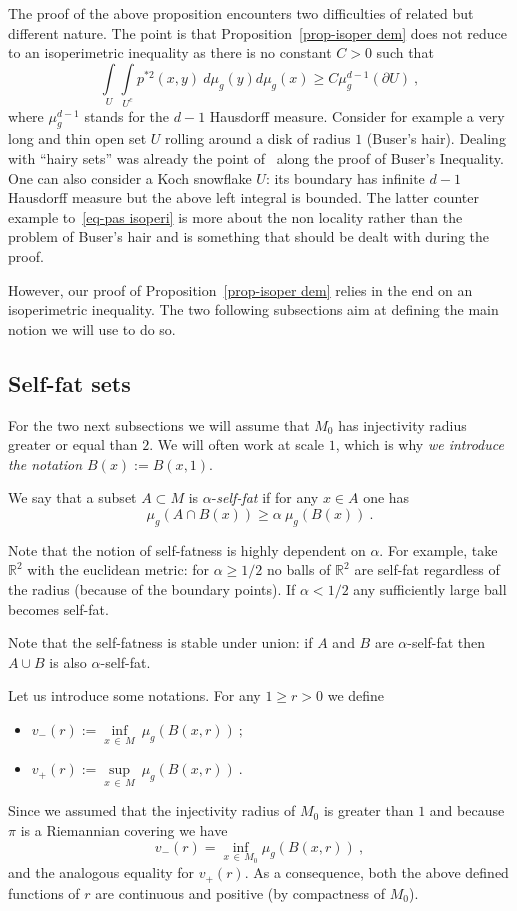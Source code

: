 \documentclass[AHL,Unicode,longabstracts,published]{cedram}
\newcommand{\RR}{\mathbb{R}}
\newcommand{\inte}[1]{\underset{#1}{\int}}
\newcommand{\infi}[1]{\underset{#1}{\inf}}
\newcommand{\supr}[1]{\underset{#1}{\sup}}
\begin{document}
The proof of the above proposition encounters two difficulties of related but different nature. The point is that Proposition~\ref{prop-isoper dem} does not reduce to an isoperimetric inequality as there is no constant $C > 0$ such that
\begin{equation}\label{eq-pas isoperi}
\inte{U} \inte{U^c} p^{*2}(x,y) \ d \mu_g(y) d \mu_g(x) \geq C \mu^{d-1}_g (\partial U) \ ,
\end{equation}
where $\mu^{d-1}_g$ stands for the $d-1$ Hausdorff measure. Consider for example a very long and thin open set $U$ rolling around a disk of radius $1$ (Buser's hair). Dealing with ``hairy sets'' was already the point of~\cite{artbuser} along the proof of Buser's Inequality. One can also consider a Koch snowflake $U$: its boundary has infinite $d-1$ Hausdorff measure but the above left integral is bounded. The latter counter example to~\eqref{eq-pas isoperi} is more about the non locality rather than the problem of Buser's hair and is something that should be dealt with during the proof.


However, our proof of Proposition~\ref{prop-isoper dem} relies in the end on an isoperimetric inequality. The two following subsections aim at defining the main notion we will use to do so.


\subsection{Self-fat sets}
For the two next subsections we will assume that $M_0$ has injectivity radius greater or equal than $2$. We will often work at scale $1$, which is why \emph{we introduce the notation $B(x) := B(x,1)$}.

We say that a subset $A \subset M$ is $\alpha$-\emph{self-fat} if for any $x \in A$ one has
\[
\mu_g(A \cap B(x)) \ge \alpha \ \mu_g(B(x)) \ .
\]

Note that the notion of self-fatness is highly dependent on $\alpha$. For example, take $\RR^2$ with the euclidean metric: for $\alpha \ge 1/2$ no balls of $\RR^2$ are self-fat regardless of the radius (because of the boundary points). If $\alpha< 1/2$ any sufficiently large ball becomes self-fat.

Note that the self-fatness is stable under union: if $A$ and $B$ are $\alpha$-self-fat then $A \cup B$ is also $\alpha$-self-fat.

Let us introduce some notations. For any $1\geq r > 0$ we define
\begin{itemize}
\item $v_-(r) := \infi{x\,\in\,M} \ \mu_g(B(x,r)) \ ; $
\item $v_+(r) := \supr{x\,\in\,M} \ \mu_g(B(x,r)) \ . $ 
\end{itemize}
Since we assumed that the injectivity radius of $M_0$ is greater than $1$ and because $\pi$ is a Riemannian covering we have
\[
v_{-}(r) = \infi{x\,\in\,M_0} \mu_g(B(x,r)) \ ,
\]
and the analogous equality for $v_+(r)$. As a consequence, both the above defined functions of $r$ are continuous and positive (by compactness of $M_0$).
\end{document}
